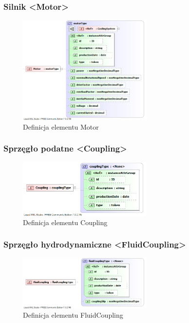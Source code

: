 \documentclass[12pt,a4paper]{article}
\begin{document}
\subsubsection{Silnik <Motor>}

\begin{figure}[h]
  \centering
  \includegraphics[width=0.6\textwidth]{png/liquid/Motor}
  \caption{Definicja elementu Motor}
  \label{fig:motor-xsd}
\end{figure}


\subsubsection{Sprzęgło podatne <Coupling>}

\begin{figure}[h]
  \centering
  \includegraphics[width=0.6\textwidth]{png/liquid/Coupling}
  \caption{Definicja elementu Coupling}
  \label{fig:coupling-xsd}
\end{figure}


\subsubsection{Sprzęgło hydrodynamiczne <FluidCoupling>}

\begin{figure}[h]
  \centering
  \includegraphics[width=0.6\textwidth]{png/liquid/FluidCoupling}
  \caption{Definicja elementu FluidCoupling}
  \label{fig:fluidCoupling-xsd}
\end{figure}
\end{document}
